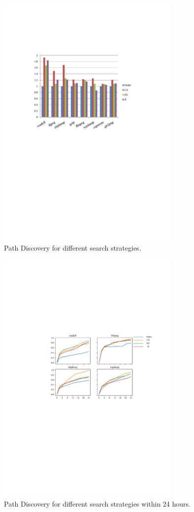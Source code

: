 \begin{figure}
\centering
\includegraphics[width=0.8\textwidth]{figures/path-discovery.pdf} 
\caption{Path Discovery for different search strategies.}\label{path-discovery}
\end{figure}
\begin{figure}
\centering
\includegraphics[width=0.8\textwidth]{figures/path-time-detail.pdf} 
\caption{Path Discovery for different search strategies within 24 hours.}\label{path-detail}
\end{figure}
